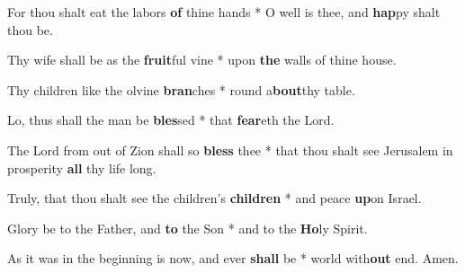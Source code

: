 \begin{multicols}{2}
	For thou shalt eat the labors \textbf{of} thine hands * O well is thee, and \textbf{hap}py shalt thou be.
	
	Thy wife shall be as the \textbf{fruit}ful vine * upon \textbf{the} walls of thine house.
	
	Thy children like the olvine \textbf{bran}ches * round a\textbf{bout}thy table.
	
	Lo, thus shall the man be \textbf{bles}sed * that \textbf{fear}eth the Lord.
	
	The Lord from out of Zion shall so \textbf{bless} thee * that thou shalt see Jerusalem in prosperity \textbf{all} thy life long.
	
	Truly, that thou shalt see the children's \textbf{children} * and peace \textbf{up}on Israel.
	
	Glory be to the Father, and \textbf{to} the Son * and to the \textbf{Ho}ly Spirit.
	
	As it was in the beginning is now, and ever \textbf{shall} be * world with\textbf{out} end. Amen.
\end{multicols}